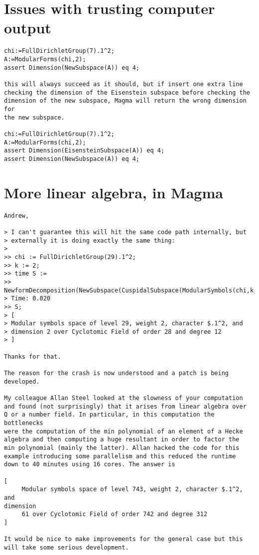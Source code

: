\documentclass[11pt]{amsart}
\numberwithin{equation}{subsection}
\theoremstyle{definition}
\begin{document}
\section{Issues with trusting computer output}

\begin{verbatim}
chi:=FullDirichletGroup(7).1^2;
A:=ModularForms(chi,2);
assert Dimension(NewSubspace(A)) eq 4;

this will always succeed as it should, but if insert one extra line 
checking the dimension of the Eisenstein subspace before checking the 
dimension of the new subspace, Magma will return the wrong dimension for 
the new subspace.

chi:=FullDirichletGroup(7).1^2;
A:=ModularForms(chi,2);
assert Dimension(EisensteinSubspace(A)) eq 4;
assert Dimension(NewSubspace(A)) eq 4;
\end{verbatim}

\section{More linear algebra, in Magma}

\begin{verbatim}
Andrew,

> I can't guarantee this will hit the same code path internally, but
> externally it is doing exactly the same thing:
> 
>> chi := FullDirichletGroup(29).1^2;
>> k := 2;
>> time S :=
>> NewformDecomposition(NewSubspace(CuspidalSubspace(ModularSymbols(chi,k,-1))));
> Time: 0.020
>> S;
> [
> Modular symbols space of level 29, weight 2, character $.1^2, and
> dimension 2 over Cyclotomic Field of order 28 and degree 12
> ]

Thanks for that.

The reason for the crash is now understood and a patch is being
developed.

My colleague Allan Steel looked at the slowness of your computation
and found (not surprisingly) that it arises from linear algebra over
Q or a number field. In particular, in this computation the bottlenecks
were the computation of the min polynomial of an element of a Hecke
algebra and then computing a huge resultant in order to factor the
min polynomial (mainly the latter). Allan hacked the code for this
example introducing some parallelism and this reduced the runtime
down to 40 minutes using 16 cores. The answer is

[
     Modular symbols space of level 743, weight 2, character $.1^2, and 
dimension
     61 over Cyclotomic Field of order 742 and degree 312
]

It would be nice to make improvements for the general case but this
will take some serious development.
\end{verbatim}
\end{document}
